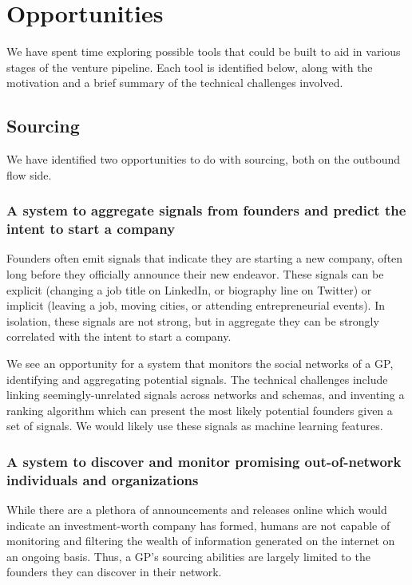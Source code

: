 \section{Opportunities}

We have spent time exploring possible tools that could be built to aid in various stages of the venture pipeline. Each tool is identified below, along with the motivation and a brief summary of the technical challenges involved.

\subsection{Sourcing}

We have identified two opportunities to do with sourcing, both on the outbound flow side.

\subsubsection{A system to aggregate signals from founders and predict the intent to start a company}

Founders often emit signals that indicate they are starting a new company, often long before they officially announce their new endeavor. These signals can be explicit (changing a job title on LinkedIn, or biography line on Twitter) or implicit (leaving a job, moving cities, or attending entrepreneurial events). In isolation, these signals are not strong, but in aggregate they can be strongly correlated with the intent to start a company.

We see an opportunity for a system that monitors the social networks of a GP, identifying and aggregating potential signals. The technical challenges include linking seemingly-unrelated signals across networks and schemas, and inventing a ranking algorithm which can present the most likely potential founders given a set of signals. We would likely use these signals as machine learning features.

\subsubsection{A system to discover and monitor promising out-of-network individuals and organizations}

While there are a plethora of announcements and releases online which would indicate an investment-worth company has formed, humans are not capable of monitoring and filtering the wealth of information generated on the internet on an ongoing basis. Thus, a GP's sourcing abilities are largely limited to the founders they can discover in their network.

